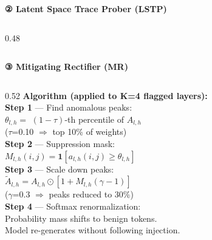\documentclass[aspectratio=169]{beamer}
\begin{document}
\begin{frame}{\textcolor{cmindsblue}{\textbf{② Latent Space Trace Prober (LSTP)}}}
\begin{columns}[T]
\begin{column}{0.48\textwidth}
      \vspace{3mm}
      \begin{center}
      \end{center}
    \end{column}
  \end{columns}
\end{frame}


\begin{frame}{\textcolor{cmindsblue}{\textbf{③ Mitigating Rectifier (MR)}}}\vspace{-0.3cm}
  \begin{columns}[T]
    \begin{column}{0.52\textwidth}
      \textcolor{cmindsblue}{\textbf{Algorithm (applied to K=4 flagged layers):}}\\[4pt]
      {\small
      \textbf{Step 1} — Find anomalous peaks:\\
      $\theta_{l,h} = $ $(1-\tau)$-th percentile of $A_{l,h}$\\
      \quad ($\tau$=0.10 $\Rightarrow$ top 10\% of weights)\\[4pt]
      \textbf{Step 2} — Suppression mask:\\
      $M_{l,h}(i,j) = \mathbf{1}[a_{l,h}(i,j) \geq \theta_{l,h}]$\\[4pt]
      \textbf{Step 3} — Scale down peaks:\\
      $\tilde{A}_{l,h} = A_{l,h} \odot [1 + M_{l,h}(\gamma - 1)]$\\
      \quad ($\gamma$=0.3 $\Rightarrow$ peaks reduced to 30\%)\\[4pt]
      \textbf{Step 4} — Softmax renormalization:\\
      Probability mass shifts to benign tokens.\\
      Model re-generates without following injection.
      }
    \end{column}


\end{columns}
\end{frame}
\end{document}
